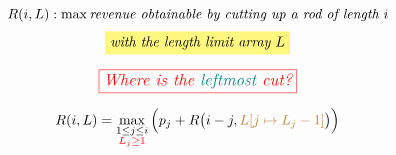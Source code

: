 \begin{frame}{}
  \[
    R(i, L): \max \text{\it revenue obtainable by cutting up a rod of length $i$}
  \]
  \[
    \hl{yellow}{\it with the length limit array $L$}
  \]

  \pause
  \vspace{0.20cm}
  \[
    \textcolor{red}{\fbox{\large \it Where is the \textcolor{teal}{leftmost} cut?}}
  \]

  \pause
  \[
    R(i, L) = \max_{\substack{1 \le j \le i \\ \textcolor{red}{L_j \ge 1}}} \Big(p_j + R\big(i-j, \textcolor{brown}{L[j \mapsto L_j-1]}\big)\Big)
  \]

  \pause
\end{frame}
